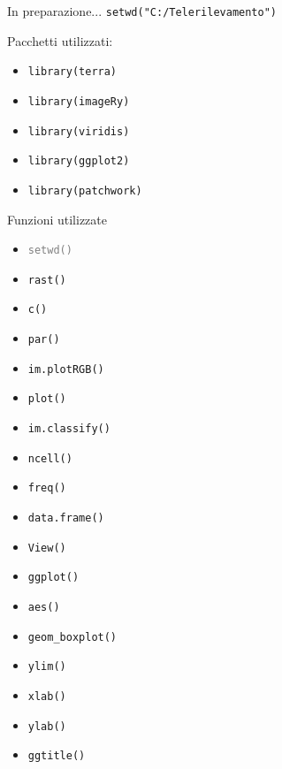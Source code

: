 \documentclass{beamer} %
\begin{document}
        
        \begin{frame}{In preparazione...}
        \texttt{setwd("C:/Telerilevamento")}
        
        \bigskip
        \bigskip
        Pacchetti utilizzati:
        \bigskip
            \begin{itemize}
                \item    \texttt{library(terra)} %
                \item    \texttt{library(imageRy)} 
                \item    \texttt{library(viridis)}
                \item    \texttt{library(ggplot2)} 
                \item    \texttt{library(patchwork)}
            \end{itemize}
        \end{frame}

\begin{frame}{Funzioni utilizzate}
                \begin{multicols}{2}
                    \begin{itemize}
                        \item    \texttt{\textcolor{gray}{setwd()}} 
                        \item    \texttt{rast()} 
                        \item    \texttt{c()}
                        \item    \texttt{par()} 
                        \item    \texttt{im.plotRGB()}
                        \item    \texttt{plot()}
                        \item    \texttt{im.classify()}
                        \item    \texttt{ncell()}
                        \item    \texttt{freq()}
                \columnbreak
                        \item    \texttt{data.frame()}
                        \item    \texttt{View()}
                        \item    \texttt{ggplot()}
                        \item    \texttt{aes()}
                        \item    \texttt{geom_boxplot()}
                        \item    \texttt{ylim()}
                        \item    \texttt{xlab()}
                        \item    \texttt{ylab()}
                        \item    \texttt{ggtitle()}
                    \end{itemize}
                \end{multicols}
 \end{frame}
 
\end{document}
